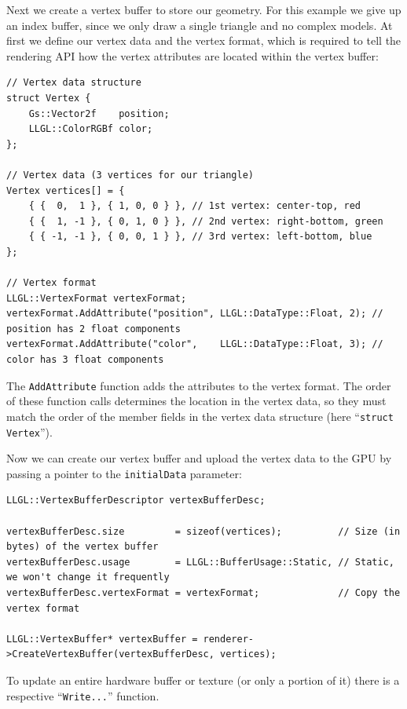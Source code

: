 \documentclass{article}
\begin{document}
\newpage
\noindent
Next we create a vertex buffer to store our geometry. For this example we give up an index buffer,
since we only draw a single triangle and no complex models. At first we define our vertex data and the vertex format,
which is required to tell the rendering API how the vertex attributes are located within the vertex buffer:
\begin{lstlisting}
// Vertex data structure
struct Vertex {
    Gs::Vector2f    position;
    LLGL::ColorRGBf color;
};

// Vertex data (3 vertices for our triangle)
Vertex vertices[] = {
    { {  0,  1 }, { 1, 0, 0 } }, // 1st vertex: center-top, red
    { {  1, -1 }, { 0, 1, 0 } }, // 2nd vertex: right-bottom, green
    { { -1, -1 }, { 0, 0, 1 } }, // 3rd vertex: left-bottom, blue
};

// Vertex format
LLGL::VertexFormat vertexFormat;
vertexFormat.AddAttribute("position", LLGL::DataType::Float, 2); // position has 2 float components
vertexFormat.AddAttribute("color",    LLGL::DataType::Float, 3); // color has 3 float components
\end{lstlisting}
The \texttt{AddAttribute} function adds the attributes to the vertex format.
The order of these function calls determines the location in the vertex data, so they must match
the order of the member fields in the vertex data structure (here ``\texttt{struct Vertex}'').

Now we can create our vertex buffer and upload the vertex data to the GPU by passing a pointer
to the \texttt{initialData} parameter:
\begin{lstlisting}
LLGL::VertexBufferDescriptor vertexBufferDesc;

vertexBufferDesc.size         = sizeof(vertices);          // Size (in bytes) of the vertex buffer
vertexBufferDesc.usage        = LLGL::BufferUsage::Static, // Static, we won't change it frequently
vertexBufferDesc.vertexFormat = vertexFormat;              // Copy the vertex format

LLGL::VertexBuffer* vertexBuffer = renderer->CreateVertexBuffer(vertexBufferDesc, vertices);
\end{lstlisting}
To update an entire hardware buffer or texture (or only a portion of it) there is a respective
``\texttt{Write...}'' function.
\end{document}
